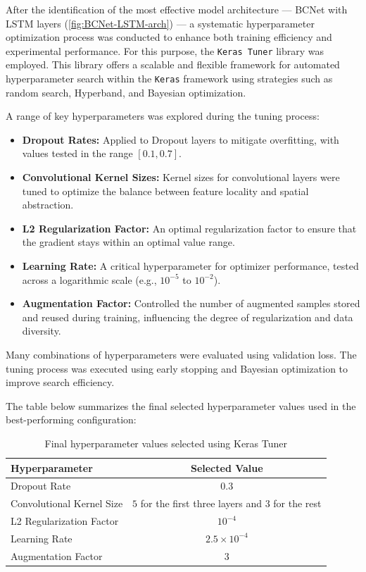 After the identification of the most effective model architecture --- BCNet with LSTM layers (\autoref{fig:BCNet-LSTM-arch}) --- a systematic hyperparameter optimization process was conducted to enhance both training efficiency and experimental performance. For this purpose, the \texttt{Keras Tuner} library was employed. This library offers a scalable and flexible framework for automated hyperparameter search within the \texttt{Keras} framework using strategies such as random search, Hyperband, and Bayesian optimization.

A range of key hyperparameters was explored during the tuning process:

\begin{itemize}
  \item \textbf{Dropout Rates:} Applied to Dropout layers to mitigate overfitting, with values tested in the range \([0.1, 0.7]\).
  \item \textbf{Convolutional Kernel Sizes:} Kernel sizes for convolutional layers were tuned to optimize the balance between feature locality and spatial abstraction.
  \item \textbf{L2 Regularization Factor:} An optimal regularization factor to ensure that the gradient stays within an optimal value range.
  \item \textbf{Learning Rate:} A critical hyperparameter for optimizer performance, tested across a logarithmic scale (e.g., \(10^{-5}\) to \(10^{-2}\)).
  \item \textbf{Augmentation Factor:} Controlled the number of augmented samples stored and reused during training, influencing the degree of regularization and data diversity.
\end{itemize}

Many combinations of hyperparameters were evaluated using validation loss. The tuning process was executed using early stopping and Bayesian optimization to improve search efficiency.

The table below summarizes the final selected hyperparameter values used in the best-performing configuration:

\begin{table}[H]
  \centering
  \begin{tabular}{|l|c|}
    \hline
    \textbf{Hyperparameter} & \textbf{Selected Value} \\
    \hline
    Dropout Rate & $0.3$ \\
    Convolutional Kernel Size & $5$ for the first three layers and $3$ for the rest \\
    L2 Regularization Factor & $10^{-4}$ \\
    Learning Rate & $2.5 \times 10^{-4}$ \\
    Augmentation Factor & $3$ \\
    \hline
  \end{tabular}
  \caption{Final hyperparameter values selected using Keras Tuner}
  \label{tab:hyperparameters}
\end{table}

